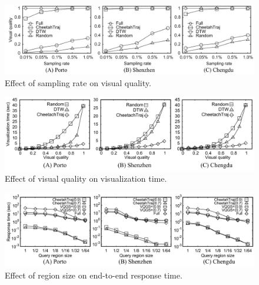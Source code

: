 
\begin{figure}
	\centering
	\small
	\includegraphics[width=1.3\columnwidth]{pictures/quantitative_study/samplerate_vq/sr_vq.pdf}  
	\trim \trim
	\caption{Effect of sampling rate on visual quality.} \label{fig:rate_quality}
	\trim \trim
\end{figure}

\begin{figure}
	\centering
	\small
	\includegraphics[width=1.3\columnwidth]{pictures/quantitative_study/quality_time/quality_time.pdf}  
	\trim \trim
	\caption{Effect of visual quality on visualization time.} \label{fig:rate_vistime}
	\trim \trim
\end{figure}



\begin{figure}[!h]
	\centering
	\small
	\includegraphics[width=1.3\columnwidth]{pictures/quantitative_study/regionsize_response_time/regionsize_time.pdf}  
	\trim \trim
	\caption{Effect of region size on end-to-end response time.} \label{fig:size_responsetime}
	\trim \trim
\end{figure}




